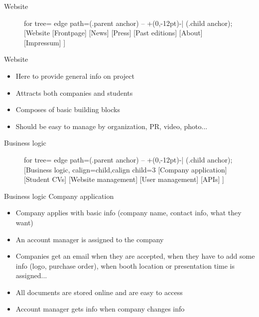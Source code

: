 \documentclass{beamer}
\begin{document}
	\begin{frame}{Website}
		\begin{figure}
			\begin{forest}
				for tree={%
					edge path={\noexpand{} (.parent anchor) -- +(0,-12pt)-| (.child anchor);}
				}
				[Website
					[Frontpage]
					[News]
					[Press]
					[Past editions]
					[About]
					[Impressum]
				]
			\end{forest}
		\end{figure}
	\end{frame}

	\begin{frame}{Website}
		\begin{itemize}
			\item Here to provide general info on project
			\item Attracts both companies and students
			\item Composes of basic building blocks
			\item Should be easy to manage by organization, PR, video, photo...
		\end{itemize}
	\end{frame}

	\begin{frame}{Business logic}
		\begin{figure}
			\begin{adjustbox}{width=\linewidth}
			\begin{forest}
				for tree={%
					edge path={\noexpand{} (.parent anchor) -- +(0,-12pt)-| (.child anchor)\forestoption{edge label};}
				}
				[Business logic, calign=child,calign child=3
					[Company application]
					[Student CVs]
					[Website management]
					[User management]
					[APIs]
				]
			\end{forest}
			\end{adjustbox}
		\end{figure}
	\end{frame}

	\begin{frame}{Business logic}
		Company application
		\begin{itemize}
			\item Company applies with basic info (company name, contact info, what they want)
			\item An account manager is assigned to the company
			\item Companies get an email when they are accepted, when they have to add some info (logo, purchase order), when booth location or presentation time is assigned...
			\item All documents are stored online and are easy to access
			\item Account manager gets info when company changes info
		\end{itemize}
	\end{frame}
\end{document}
